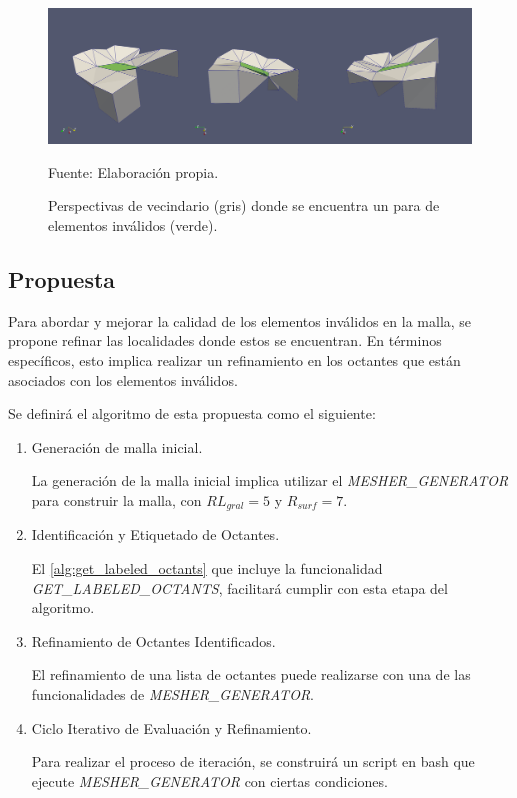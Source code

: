 \begin{figure}[!ht]
    \centering
    \includegraphics[width=1.0\textwidth]{figures/bad_quality_zone/bq_zonen_ALL.png}
    \caption{ Perspectivas de vecindario (gris) donde se encuentra un para de elementos inválidos (verde). }
    Fuente: Elaboración propia.
    \label{fig:zoom_cortex_surf_all}
\end{figure}


\subsection{Propuesta}

Para abordar y mejorar la calidad de los elementos inválidos en la malla, se propone refinar las localidades donde estos se encuentran. En términos específicos, esto implica realizar un refinamiento en los octantes que están asociados con los elementos inválidos.




Se definirá el algoritmo de esta propuesta como el siguiente:

\begin{enumerate}
    \item Generación de malla inicial.
    
        La generación de la malla inicial implica utilizar el \textit{MESHER\_GENERATOR} para construir la malla, con $RL_{gral} = 5$ y $R_{surf} = 7$. 
    \item Identificación y Etiquetado de Octantes.
        
        El \autoref{alg:get_labeled_octants} que incluye la funcionalidad \textit{GET\_LABELED\_OCTANTS}, facilitará cumplir con esta etapa del algoritmo.
    \item Refinamiento de Octantes Identificados.
        
        El refinamiento de una lista de octantes puede realizarse con una de las funcionalidades de \textit{MESHER\_GENERATOR}.
    \item Ciclo Iterativo de Evaluación y Refinamiento.
        
        Para realizar el proceso de iteración, se construirá un script en bash que ejecute \textit{MESHER\_GENERATOR} con ciertas condiciones.
\end{enumerate}

